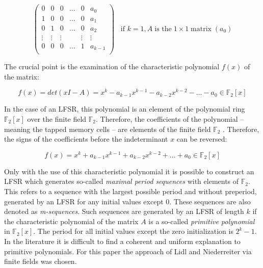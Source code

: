 \begin{equation*}
	\begin{pmatrix}
		0&0&0&\ldots&0&a_0\\
		1&0&0&\ldots&0&a_1\\
		0&1&0&\ldots&0&a_2\\
		\vdots&\vdots&\vdots&\ &\vdots&\vdots\\
		0&0&0&\ldots&1&a_{k-1}\\
	\end{pmatrix}
	\;\;\;\text{if }k=1,A\;\text{is the}\; 1 \times 1\;\text{matrix}\; (a_0)
\end{equation*}

The crucial point is the examination of the characteristic polynomial $f(x)$ of the matrix: 

\begin{equation*}
	f(x)=det(xI-A)=x^k-a_{k-1}x^{k-1}-a_{k-2}x^{k-2}-\ldots-a_0\in\mathbb{F}_2[x]
\end{equation*}

In the case of an LFSR, this polynomial is an element of the polynomial ring
$\mathbb{F}_2[x]$ over the finite field $\mathbb{F}_2$. Therefore, the coefficients of the polynomial – meaning the tapped memory cells – are elements of the finite field $\mathbb{F}_2$ \cite[pp. 18-19]{Lidl.1997}. Therefore, the signs of the coefficients before the indeterminant $x$ can be reversed:

\begin{equation*}
	f(x)=x^k+a_{k-1}x^{k-1}+a_{k-2}x^{k-2}+\ldots+a_0\in \mathbb{F}_2[x]
\end{equation*}

Only with the use of this characteristic polynomial it is possible to construct an LFSR which generates so-called \textit{maximal period sequences} with elements of $\mathbb{F}_2$. This refers to a sequence with the largest possible period and without preperiod, generated by an LFSR for any initial values except $0$. These sequences are also denoted as \textit{m-sequences}. Such sequences are generated by an LFSR of length $k$ if the characteristic polynomial of the matrix $A$ is a so-called \textit{primitive polynomial} in $\mathbb{F}_2[x]$. The period for all initial values except the zero initialization is $2^{k}-1$. \cite[p. 201]{Lidl.1986} \\

In the literature it is difficult to find a coherent and uniform explanation to primitive polynomials. For this paper the approach of Lidl and Niederreiter via finite fields was chosen.\\

